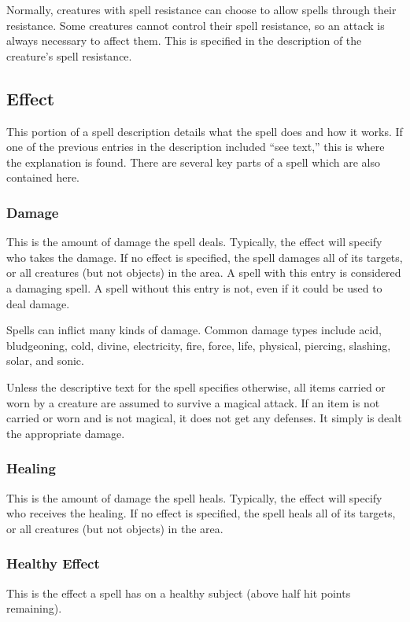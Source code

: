 Normally, creatures with spell resistance can choose to allow spells through their resistance. Some creatures cannot control their spell resistance, so an attack is always necessary to affect them. This is specified in the description of the creature's spell resistance.

\subsection{Effect}
This portion of a spell description details what the spell does and how it works. If one of the previous entries in the description included ``see text,'' this is where the explanation is found. There are several key parts of a spell which are also contained here.

\subsubsection{Damage}
This is the amount of damage the spell deals. Typically, the effect will specify who takes the damage. If no effect is specified, the spell damages all of its targets, or all creatures (but not objects) in the area. A spell with this entry is considered a damaging spell. A spell without this entry is not, even if it could be used to deal damage.

Spells can inflict many kinds of damage. Common damage types include acid, bludgeoning, cold, divine, electricity, fire, force, life, physical, piercing, slashing, solar, and sonic.

 Unless the descriptive text for the spell specifies otherwise, all items carried or worn by a creature are assumed to survive a magical attack. If an item is not carried or worn and is not magical, it does not get any defenses. It simply is dealt the appropriate damage.

\subsubsection{Healing}
This is the amount of damage the spell heals. Typically, the effect will specify who receives the healing. If no effect is specified, the spell heals all of its targets, or all creatures (but not objects) in the area.

\subsubsection{Healthy Effect}
This is the effect a spell has on a healthy subject (above half hit points remaining).

